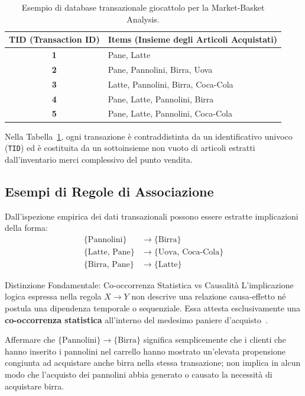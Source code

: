\begin{table}[H]
\centering
\small
\renewcommand{\arraystretch}{1.2}
\begin{tabular}{c l}
\toprule
\textbf{TID (Transaction ID)} & \textbf{Items (Insieme degli Articoli Acquistati)} \\
\midrule
\textbf{1} & Pane, Latte \\
\textbf{2} & Pane, Pannolini, Birra, Uova \\
\textbf{3} & Latte, Pannolini, Birra, Coca-Cola \\
\textbf{4} & Pane, Latte, Pannolini, Birra \\
\textbf{5} & Pane, Latte, Pannolini, Coca-Cola \\
\bottomrule
\end{tabular}
\caption{Esempio di database transazionale giocattolo per la Market-Basket Analysis.}
\label{tab:dm-market-basket-toy}
\end{table}

Nella Tabella~\ref{tab:dm-market-basket-toy}, ogni transazione è contraddistinta da un identificativo univoco (\texttt{TID}) ed è costituita da un sottoinsieme non vuoto di articoli estratti dall'inventario merci complessivo del punto vendita.

\FloatBarrier
\subsection{Esempi di Regole di Associazione}
Dall'ispezione empirica dei dati transazionali possono essere estratte implicazioni della forma:
\begin{align}
\{\text{Pannolini}\} &\longrightarrow \{\text{Birra}\} \label{eq:dm-toy-rule-1} \\
\{\text{Latte, Pane}\} &\longrightarrow \{\text{Uova, Coca-Cola}\} \label{eq:dm-toy-rule-2} \\
\{\text{Birra, Pane}\} &\longrightarrow \{\text{Latte}\} \label{eq:dm-toy-rule-3}
\end{align}

\begin{noteblock}{Distinzione Fondamentale: Co-occorrenza Statistica vs Causalità}
    L'implicazione logica espressa nella regola $X \rightarrow Y$ non descrive una relazione causa-effetto né postula una dipendenza temporale o sequenziale. Essa attesta esclusivamente una \textbf{co-occorrenza statistica} all'interno del medesimo paniere d'acquisto~\cite{tan2018}.
    
    Affermare che $\{\text{Pannolini}\} \rightarrow \{\text{Birra}\}$ significa semplicemente che i clienti che hanno inserito i pannolini nel carrello hanno mostrato un'elevata propensione congiunta ad acquistare anche birra nella stessa transazione; non implica in alcun modo che l'acquisto dei pannolini abbia generato o causato la necessità di acquistare birra.
\end{noteblock}

